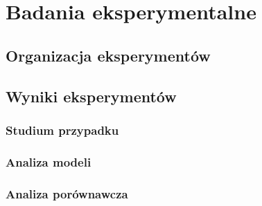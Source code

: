 \chapter{Badania eksperymentalne}
\section{Organizacja eksperymentów}
\section{Wyniki eksperymentów}
\subsection{Studium przypadku}
\subsection{Analiza modeli}
\subsection{Analiza porównawcza}
